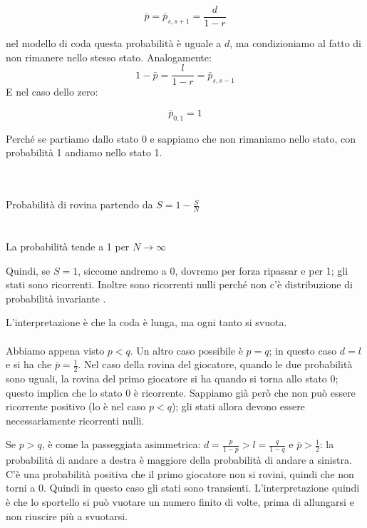 \documentclass[a4paper,12pt]{book}
\begin{document}
$$ \bar{p}=\bar{p}_{s, s+1} = \frac{d}{1-r}$$

nel modello di coda questa probabilità è uguale a $ d $, ma condizioniamo al fatto di non rimanere nello stesso stato. Analogamente:
$$ 1-\bar{p}= \frac{l}{1-r} = \bar{p}_{s,s-1} $$
E nel caso dello zero:

$$ \bar{p}_{0,1} = 1 $$

Perché se partiamo dallo stato 0 e sappiamo che non rimaniamo nello stato, con probabilità 1 andiamo nello stato 1.

\begin{multicols}{2}
	\\
	\\
	Probabilità di rovina partendo da $S = 1- \frac{S}{N} $\\ 
	\\
	\\
	La probabilità tende a 1 per $ N \to \infty $
\end{multicols}

Quindi, se $ S = 1 $, siccome andremo a 0, dovremo per forza ripassar e per 1; gli stati sono ricorrenti. Inoltre sono ricorrenti nulli perché non c'è distribuzione di probabilità invariante . 

L'interpretazione è che la coda è lunga, ma ogni tanto si svuota. 
\\
\\
Abbiamo appena visto $ p < q $. Un altro caso possibile è $ p = q $; in questo caso $ d = l $ e si ha che $ \bar{p} = \frac{1}{2} $. Nel caso della rovina del giocatore, quando le due probabilità sono uguali, la rovina del primo giocatore si ha quando si torna allo stato 0; questo implica che lo stato 0 è ricorrente. Sappiamo già però che non può essere ricorrente positivo (lo è nel caso $ p < q $); gli stati allora devono essere necessariamente ricorrenti nulli. 

Se $ p > q $, è come la passeggiata asimmetrica: $ d = \frac{p}{1-p} > l = \frac{q}{1-q} $ e $ \bar{p} > \frac{1}{2} $: la probabilità di andare a destra è maggiore della probabilità di andare a sinistra. C'è una probabilità positiva che il primo giocatore non si rovini, quindi che non torni a 0. Quindi in questo caso gli stati sono transienti. L'interpretazione quindi è che lo sportello si può vuotare un numero finito di volte, prima di allungarsi e non riuscire più a svuotarsi. 
\end{document}
